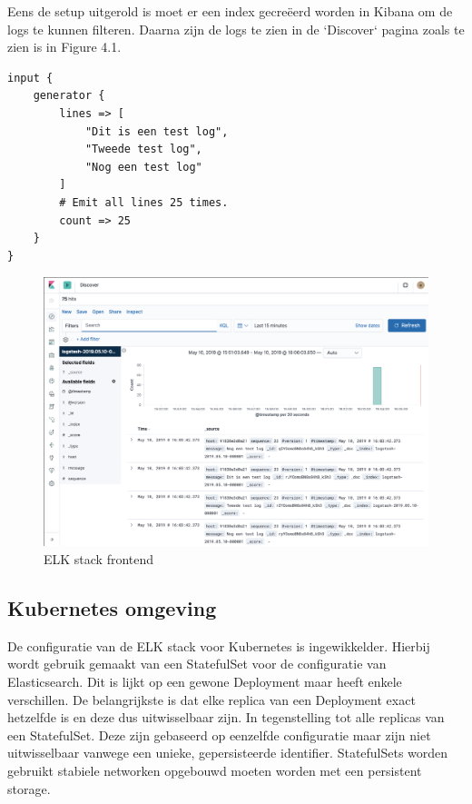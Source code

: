 Eens de setup uitgerold is moet er een index gecreëerd worden in Kibana om de logs te kunnen filteren. Daarna zijn de logs te zien in de `Discover` pagina zoals te zien is in Figure 4.1.


\begin{lstlisting}[caption=Log generator plugin config Logstash]
input {
    generator {
        lines => [
            "Dit is een test log",
            "Tweede test log",
            "Nog een test log"
        ]
        # Emit all lines 25 times.
        count => 25
    }
}
\end{lstlisting}

\begin{figure}[ht]
    \centering
    \includegraphics[scale=0.35]{img/ELK-stack-frontend}
    \caption[ELK stack frontend]{ELK stack frontend}
\end{figure}

\subsection{Kubernetes omgeving}

De configuratie van de ELK stack voor Kubernetes is ingewikkelder. Hierbij wordt gebruik gemaakt van een StatefulSet voor de configuratie van Elasticsearch. Dit is lijkt op een gewone Deployment maar heeft enkele verschillen. De belangrijkste is dat elke replica van een Deployment exact hetzelfde is en deze dus uitwisselbaar zijn. In tegenstelling tot alle replicas van een StatefulSet. Deze zijn gebaseerd op eenzelfde configuratie maar zijn niet uitwisselbaar vanwege een unieke, gepersisteerde identifier. StatefulSets worden gebruikt stabiele networken opgebouwd moeten worden met een persistent storage.

